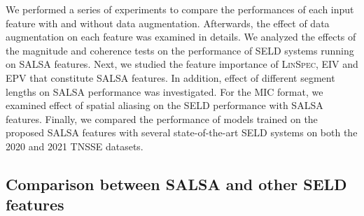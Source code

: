 \documentclass[journal]{IEEEtran}
\begin{document}
We performed a series of experiments to compare the performances of each input feature with and without data augmentation. Afterwards, the effect of data augmentation on each feature was examined in details. We analyzed the effects of the magnitude and coherence tests on the performance of SELD systems running on SALSA features. Next, we studied the feature importance of \textsc{LinSpec}, EIV and EPV that constitute SALSA features. In addition, effect of different segment lengths on SALSA performance was investigated. For the MIC format, we examined effect of spatial aliasing on the SELD performance with SALSA features. Finally, we compared the performance of models trained on the proposed SALSA features with several state-of-the-art SELD systems on both the 2020 and 2021 TNSSE datasets. 

\subsection{Comparison between SALSA and other SELD features}
\end{document}
